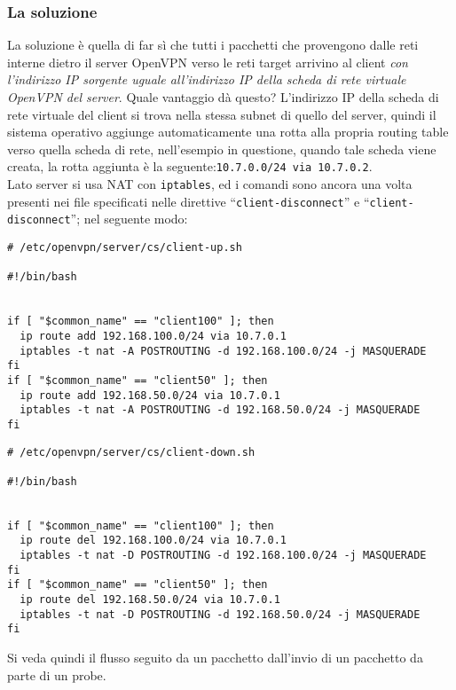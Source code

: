 \subsubsection{La soluzione}
La soluzione è quella di far sì che tutti i pacchetti che provengono dalle reti interne
dietro il server OpenVPN
verso le reti target arrivino al client \textit{con l'indirizzo IP sorgente uguale
all'indirizzo IP della scheda di rete virtuale OpenVPN del server}. Quale vantaggio dà questo?
L'indirizzo IP della scheda di rete virtuale del client si trova nella stessa subnet
di quello del server, quindi il sistema operativo aggiunge automaticamente una rotta
alla propria routing table verso quella scheda di rete, nell'esempio in questione, quando
tale scheda viene creata, la rotta aggiunta è la seguente:\texttt{10.7.0.0/24 via 10.7.0.2}.\\
Lato server si usa
NAT con \texttt{iptables}, ed i comandi sono ancora una volta presenti
nei file specificati nelle direttive ``\texttt{client-disconnect}'' e ``\texttt{client-disconnect}'';
nel seguente modo:
\begin{verbatim}
# /etc/openvpn/server/cs/client-up.sh

#!/bin/bash


if [ "$common_name" == "client100" ]; then
  ip route add 192.168.100.0/24 via 10.7.0.1
  iptables -t nat -A POSTROUTING -d 192.168.100.0/24 -j MASQUERADE
fi
if [ "$common_name" == "client50" ]; then
  ip route add 192.168.50.0/24 via 10.7.0.1
  iptables -t nat -A POSTROUTING -d 192.168.50.0/24 -j MASQUERADE
fi
\end{verbatim}
\begin{verbatim}
# /etc/openvpn/server/cs/client-down.sh

#!/bin/bash


if [ "$common_name" == "client100" ]; then
  ip route del 192.168.100.0/24 via 10.7.0.1
  iptables -t nat -D POSTROUTING -d 192.168.100.0/24 -j MASQUERADE
fi
if [ "$common_name" == "client50" ]; then
  ip route del 192.168.50.0/24 via 10.7.0.1
  iptables -t nat -D POSTROUTING -d 192.168.50.0/24 -j MASQUERADE
fi
\end{verbatim}
Si veda quindi il flusso
seguito da un pacchetto dall'invio di un pacchetto da parte di un probe.
